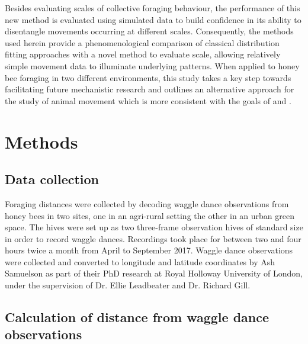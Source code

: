\documentclass[11pt,usenames,dvipsnames,a4paper]{article}
\begin{document}
\begin{linenumbers}
Besides evaluating scales of collective foraging behaviour, the performance of this new method is evaluated using simulated data to build confidence in its ability to disentangle movements occurring at different scales. Consequently, the methods used herein provide a phenomenological comparison of classical distribution fitting approaches with a novel method to evaluate scale, allowing relatively simple movement data to illuminate underlying patterns. When applied to honey bee foraging in two different environments, this study takes a key step towards facilitating future mechanistic research and outlines an alternative approach for the study of animal movement which is more consistent with the goals of \cite{Nathan2008} and \cite{Patterson2017}.
\end{linenumbers}
	
\section{Methods}

\subsection{Data collection}

\begin{linenumbers}
\hspace{\parindent}
Foraging distances were collected by decoding waggle dance observations from honey bees in two sites, one in an agri-rural setting the other in an urban green space. The hives were set up as two three-frame observation hives of standard size in order to record waggle dances. Recordings took place for between two and four hours twice a month from April to September 2017. Waggle dance observations were collected and converted to longitude and latitude coordinates by Ash Samuelson as part of their PhD research at Royal Holloway University of London, under the supervision of Dr. Ellie Leadbeater and Dr. Richard Gill.
\end{linenumbers}

\subsection{Calculation of distance from waggle dance observations}
\end{document}
